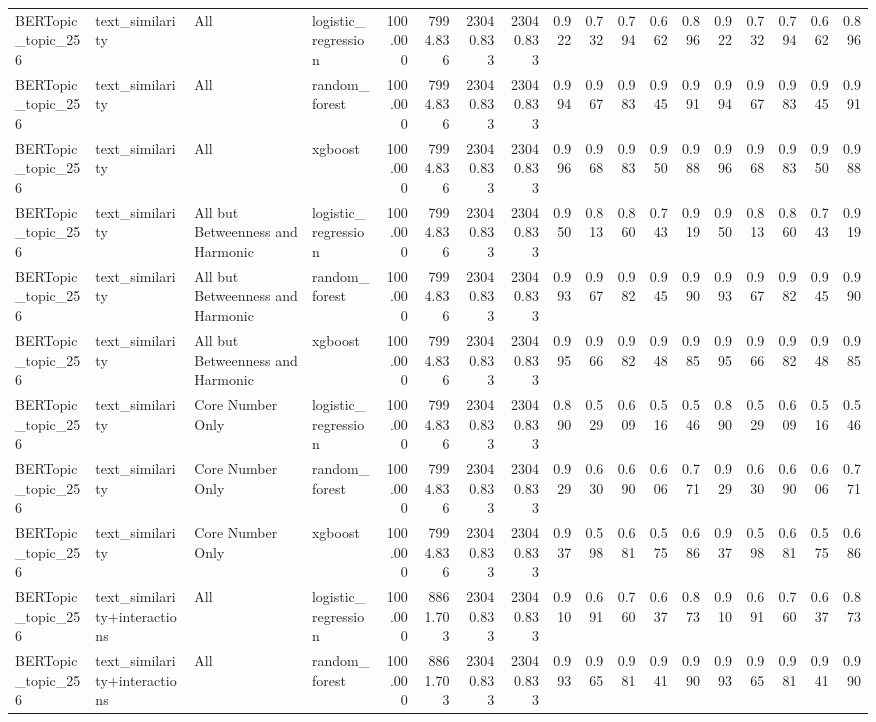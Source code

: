\begin{tabular}{llllrrrrrrrrrrrrrr}
BERTopic\_topic\_256 & text\_similarity & All & logistic\_regression & 100.000 & 7994.836 & 23040.833 & 23040.833 & 0.922 & 0.732 & 0.794 & 0.662 & 0.896 & 0.922 & 0.732 & 0.794 & 0.662 & 0.896 \\
BERTopic\_topic\_256 & text\_similarity & All & random\_forest & 100.000 & 7994.836 & 23040.833 & 23040.833 & 0.994 & 0.967 & 0.983 & 0.945 & 0.991 & 0.994 & 0.967 & 0.983 & 0.945 & 0.991 \\
BERTopic\_topic\_256 & text\_similarity & All & xgboost & 100.000 & 7994.836 & 23040.833 & 23040.833 & 0.996 & 0.968 & 0.983 & 0.950 & 0.988 & 0.996 & 0.968 & 0.983 & 0.950 & 0.988 \\
BERTopic\_topic\_256 & text\_similarity & All but Betweenness and Harmonic & logistic\_regression & 100.000 & 7994.836 & 23040.833 & 23040.833 & 0.950 & 0.813 & 0.860 & 0.743 & 0.919 & 0.950 & 0.813 & 0.860 & 0.743 & 0.919 \\
BERTopic\_topic\_256 & text\_similarity & All but Betweenness and Harmonic & random\_forest & 100.000 & 7994.836 & 23040.833 & 23040.833 & 0.993 & 0.967 & 0.982 & 0.945 & 0.990 & 0.993 & 0.967 & 0.982 & 0.945 & 0.990 \\
BERTopic\_topic\_256 & text\_similarity & All but Betweenness and Harmonic & xgboost & 100.000 & 7994.836 & 23040.833 & 23040.833 & 0.995 & 0.966 & 0.982 & 0.948 & 0.985 & 0.995 & 0.966 & 0.982 & 0.948 & 0.985 \\
BERTopic\_topic\_256 & text\_similarity & Core Number Only & logistic\_regression & 100.000 & 7994.836 & 23040.833 & 23040.833 & 0.890 & 0.529 & 0.609 & 0.516 & 0.546 & 0.890 & 0.529 & 0.609 & 0.516 & 0.546 \\
BERTopic\_topic\_256 & text\_similarity & Core Number Only & random\_forest & 100.000 & 7994.836 & 23040.833 & 23040.833 & 0.929 & 0.630 & 0.690 & 0.606 & 0.771 & 0.929 & 0.630 & 0.690 & 0.606 & 0.771 \\
BERTopic\_topic\_256 & text\_similarity & Core Number Only & xgboost & 100.000 & 7994.836 & 23040.833 & 23040.833 & 0.937 & 0.598 & 0.681 & 0.575 & 0.686 & 0.937 & 0.598 & 0.681 & 0.575 & 0.686 \\
BERTopic\_topic\_256 & text\_similarity+interactions & All & logistic\_regression & 100.000 & 8861.703 & 23040.833 & 23040.833 & 0.910 & 0.691 & 0.760 & 0.637 & 0.873 & 0.910 & 0.691 & 0.760 & 0.637 & 0.873 \\
BERTopic\_topic\_256 & text\_similarity+interactions & All & random\_forest & 100.000 & 8861.703 & 23040.833 & 23040.833 & 0.993 & 0.965 & 0.981 & 0.941 & 0.990 & 0.993 & 0.965 & 0.981 & 0.941 & 0.990 \\

\end{tabular}
